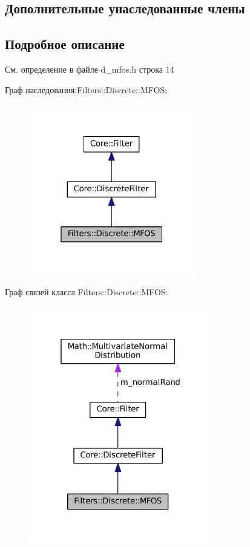 \subsection*{Дополнительные унаследованные члены}


\subsection{Подробное описание}


См. определение в файле d\+\_\+mfos.\+h строка 14



Граф наследования\+:Filters\+:\+:Discrete\+:\+:M\+F\+OS\+:
\nopagebreak
\begin{figure}[H]
\begin{center}
\leavevmode
\includegraphics[width=205pt]{class_filters_1_1_discrete_1_1_m_f_o_s__inherit__graph}
\end{center}
\end{figure}


Граф связей класса Filters\+:\+:Discrete\+:\+:M\+F\+OS\+:
\nopagebreak
\begin{figure}[H]
\begin{center}
\leavevmode
\includegraphics[width=229pt]{class_filters_1_1_discrete_1_1_m_f_o_s__coll__graph}
\end{center}
\end{figure}


